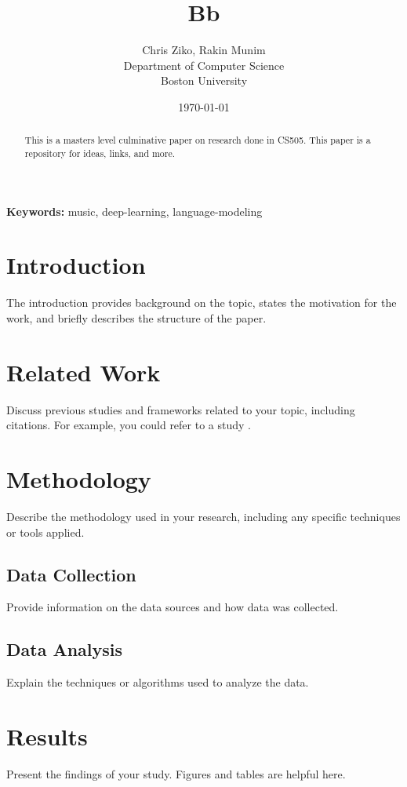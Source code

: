 \documentclass[12pt]{article}
\title{Bb}
\author{Chris Ziko, Rakin Munim \\ Department of Computer Science \\ Boston University}
\date{\today}
\begin{document}
\maketitle

\begin{abstract}
This is a masters level culminative paper on research done in CS505. This paper is a repository for ideas, links, and more. 
\end{abstract}

\textbf{Keywords:} music, deep-learning, language-modeling

\section{Introduction}
The introduction provides background on the topic, states the motivation for the work, and briefly describes the structure of the paper.

\section{Related Work}
Discuss previous studies and frameworks related to your topic, including citations. For example, you could refer to a study \cite{raffel2016lakhmidi}.

\section{Methodology}
Describe the methodology used in your research, including any specific techniques or tools applied.

\subsection{Data Collection}
Provide information on the data sources and how data was collected.

\subsection{Data Analysis}
Explain the techniques or algorithms used to analyze the data.

\section{Results}
Present the findings of your study. Figures and tables are helpful here.
\end{document}
